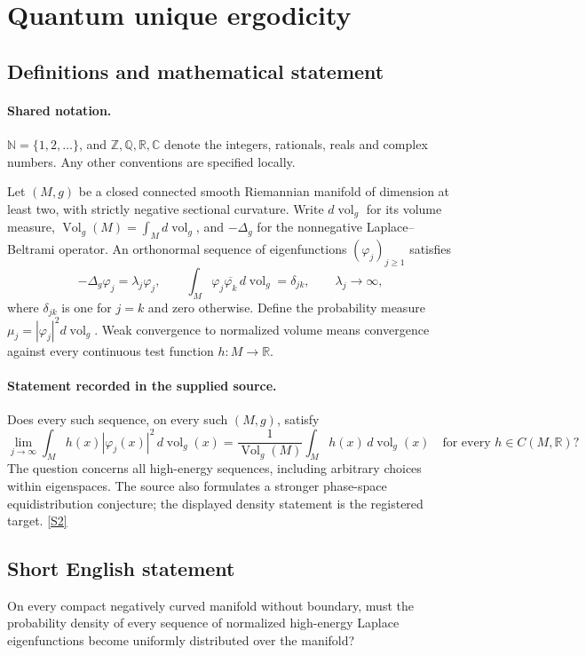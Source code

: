 \documentclass[11pt]{article}
\newcommand{\sref}[2]{\hyperlink{source:#1:#2}{[S#2]}}
\begin{document}
\section{Quantum unique ergodicity}\label{statement}

\subsection{Definitions and mathematical statement}

\paragraph{Shared notation.}$\mathbb N=\{1,2,\ldots\}$, and $\mathbb Z,\mathbb Q,\mathbb R,\mathbb C$ denote the integers, rationals, reals and complex numbers. Any other conventions are specified locally.


Let $(M,g)$ be a closed connected smooth Riemannian manifold of dimension at least two, with strictly negative sectional curvature. Write $d\operatorname{vol}_g$ for its volume measure, $\operatorname{Vol}_g(M)=\int_M d\operatorname{vol}_g$, and $-\Delta_g$ for the nonnegative Laplace--Beltrami operator. An orthonormal sequence of eigenfunctions $(\varphi_j)_{j\geq1}$ satisfies
\[
-\Delta_g\varphi_j=\lambda_j\varphi_j,\qquad
\int_M\varphi_j\overline{\varphi_k}\,d\operatorname{vol}_g=\delta_{jk},\qquad \lambda_j\longrightarrow\infty,
\]
where $\delta_{jk}$ is one for $j=k$ and zero otherwise. Define the probability measure $\mu_j=|\varphi_j|^2d\operatorname{vol}_g$. Weak convergence to normalized volume means convergence against every continuous test function $h:M\to\mathbb R$.
\paragraph{Statement recorded in the supplied source.}
Does every such sequence, on every such $(M,g)$, satisfy
\[
\lim_{j\to\infty}\int_M h(x)|\varphi_j(x)|^2\,d\operatorname{vol}_g(x)
=\frac{1}{\operatorname{Vol}_g(M)}\int_M h(x)\,d\operatorname{vol}_g(x)
\quad\text{for every }h\in C(M,\mathbb R)?
\]
The question concerns all high-energy sequences, including arbitrary choices within eigenspaces. The source also formulates a stronger phase-space equidistribution conjecture; the displayed density statement is the registered target. \sref{statement}{2}
\subsection{Short English statement}
On every compact negatively curved manifold without boundary, must the probability density of every sequence of normalized high-energy Laplace eigenfunctions become uniformly distributed over the manifold?
\end{document}
